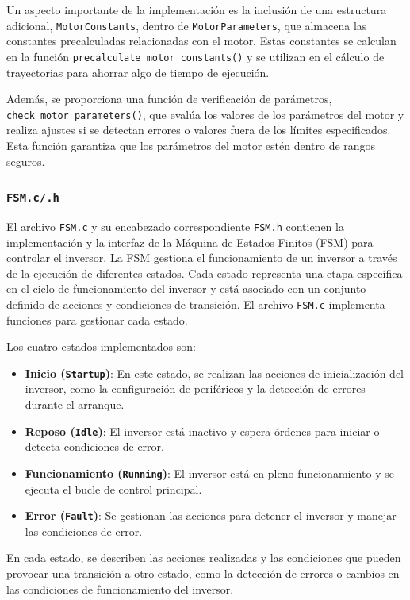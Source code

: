 Un aspecto importante de la implementación es la inclusión de una estructura adicional, \texttt{MotorConstants}, dentro de \texttt{MotorParameters}, que almacena las constantes precalculadas relacionadas con el motor. Estas constantes se calculan en la función \texttt{precalculate\_motor\_constants()} y se utilizan en el cálculo de trayectorias para ahorrar algo de tiempo de ejecución.

Además, se proporciona una función de verificación de parámetros, \texttt{check\_motor\_parameters()}, que evalúa los valores de los parámetros del motor y realiza ajustes si se detectan errores o valores fuera de los límites especificados. Esta función garantiza que los parámetros del motor estén dentro de rangos seguros.

\subsubsection{\texttt{FSM.c/.h}}

El archivo \texttt{FSM.c} y su encabezado correspondiente \texttt{FSM.h} contienen la implementación y la interfaz de la Máquina de Estados Finitos (FSM) para controlar el inversor. La FSM gestiona el funcionamiento de un inversor a través de la ejecución de diferentes estados. Cada estado representa una etapa específica en el ciclo de funcionamiento del inversor y está asociado con un conjunto definido de acciones y condiciones de transición. El archivo \texttt{FSM.c} implementa funciones para gestionar cada estado. 

Los cuatro estados implementados son:

\begin{itemize}
	\item \textbf{Inicio (\texttt{Startup})}: En este estado, se realizan las acciones de inicialización del inversor, como la configuración de periféricos y la detección de errores durante el arranque.
	\item \textbf{Reposo (\texttt{Idle})}: El inversor está inactivo y espera órdenes para iniciar o detecta condiciones de error.
	\item \textbf{Funcionamiento (\texttt{Running})}: El inversor está en pleno funcionamiento y se ejecuta el bucle de control principal.
	\item \textbf{Error (\texttt{Fault})}: Se gestionan las acciones para detener el inversor y manejar las condiciones de error.
\end{itemize}

En cada estado, se describen las acciones realizadas y las condiciones que pueden provocar una transición a otro estado, como la detección de errores o cambios en las condiciones de funcionamiento del inversor.

